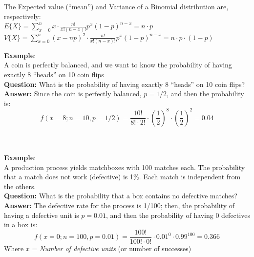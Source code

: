 \begin{frame}
  The Expected value (``mean'') and Variance of a Binomial distribution are, respectively:\\
  \vspace*{1cm}
  $E\{X\}=\displaystyle\sum_{x=0}^n x\cdot \frac{n!}{x!(n-x)!}  p^x(1-p)^{n-x}=n \cdot p$\\
  \vspace*{1cm}
  $ V\{X\}=\displaystyle\sum_{x=0}^n (x-np)^2 \cdot \frac{n!}{x!(n-x)!}  p^x(1-p)^{n-x}= n \cdot p\cdot(1-p)$
\end{frame}

\begin{frame}
  \vspace*{.5cm}
  \textbf{Example}:\\
  A coin is perfectly balanced, and we want to know the probability of having exactly 8 ``heads'' on 10 coin flips\\
  \vspace{.15cm}
  \textbf{Question:} What is the probability of having exactly 8 ``heads'' on 10 coin flips?\\
  \vspace{.25cm}
  \textbf{Answer:} Since the coin is perfectly balanced, $p=1/2$, and then the probability is:
  \vspace*{.5cm}
  $$ f(x=8;n=10,p=1/2) = \frac{10!}{8!\cdot 2!}\cdot \left(\frac{1}{2}\right) ^8 \cdot \left(\frac{1}{2}\right)^2 = 0.04 $$   \\ \hspace*{11cm} \Square \\
\end{frame}

\begin{frame}
  \textbf{Example}:\\
  A production process yields matchboxes with 100 matches each. The probability that a match does not work (defective) is 1\%. Each match is independent from the others. \\
  \textbf{Question:} What is the probability that a box contains no defective matches?\\
  \vspace{.15cm}
  \textbf{Answer:} The defective rate for the process is 1/100; then, the probability of having a defective unit is $p=0.01$, and then the probability of having 0 defectives in a box is:
  $$ f(x=0;n=100,p=0.01) = \frac{100!}{100!\cdot 0!}\cdot 0.01 ^{0} \cdot 0.99^{100} = 0.366 $$  
  \vspace*{.4cm}
  Where $x$ = \textit{Number of defective units} (or number of successes) \\ \hspace*{11cm} \Square \\
\end{frame}

